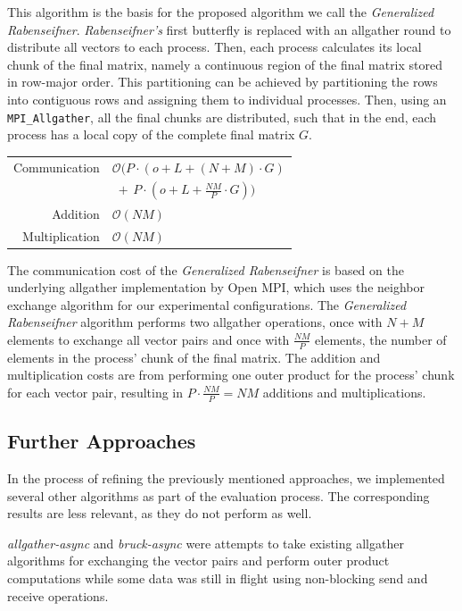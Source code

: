 \documentclass[letterpaper]{article}
\newcommand{\code}{\textit}
\newcommand{\grabenseifner}{\textit{Generalized Rabenseifner}}
\begin{document}
This algorithm is the basis for the proposed algorithm we call the \grabenseifner{}. \textit{Rabenseifner's} first butterfly is replaced with an allgather round to distribute all vectors to each process.
Then, each process calculates its local chunk of the final matrix, namely a continuous region of the final matrix stored in row-major order.
This partitioning can be achieved by partitioning the rows into contiguous rows and assigning them to individual processes.
Then, using an \verb|MPI_Allgather|, all the final chunks are distributed, such that in the end, each process has a local copy of the complete final matrix $G$.

\begin{tabular}{r l}
    Communication   &   $\mathcal{O}\big(P \cdot \left(o + L + (N+M) \cdot G \right)$ \\
                    &   $\; + \, P \cdot \left(o + L + \frac{NM}{P} \cdot G \right) \big)$ \\
    Addition        &   $\mathcal{O}(NM)$ \\    %
    Multiplication  &   $\mathcal{O}(NM)$ %
\end{tabular}

The communication cost of the \grabenseifner{} is based on the underlying allgather implementation by Open MPI, which uses the neighbor exchange algorithm for our experimental configurations. The \grabenseifner{} algorithm performs two allgather operations, once with $N + M$ elements to exchange all vector pairs and once with $\frac{NM}{P}$ elements, the number of elements in the process' chunk of the final matrix. The addition and multiplication costs are from performing one outer product for the process' chunk for each vector pair, resulting in $P\cdot \frac{NM}{P} = NM$ additions and multiplications.

\subsection{Further Approaches}


In the process of refining the previously mentioned approaches, we implemented several other algorithms as part of the evaluation process. The corresponding results are less relevant, as they do not perform as well.

\code{allgather-async} and \code{bruck-async} were attempts to take existing allgather algorithms for exchanging the vector pairs and perform outer product computations while some data was still in flight using non-blocking send and receive operations.
\end{document}
